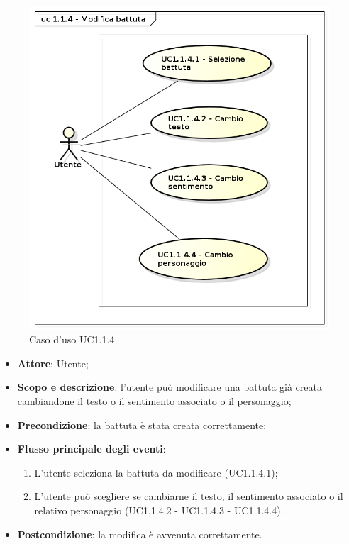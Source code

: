 \begin{figure}[htbp]
\centering
\includegraphics[scale=0.5]{UseCase_17_03_2016/immagini/uc_1_1_4_modifica_battuta.png}
\captionsetup{labelfont=bf}
\caption{Caso d'uso UC1.1.4}
\end{figure}

\begin{itemize}
\item \textbf{Attore}: Utente;
\item \textbf{Scopo e descrizione}: l'utente può modificare una battuta già creata cambiandone il testo o il sentimento associato o il personaggio; 
\item \textbf{Precondizione}: la battuta è stata creata correttamente;
\item \textbf{Flusso principale degli eventi}:
\begin{enumerate}
\item L'utente seleziona la battuta da modificare (UC1.1.4.1);
\item L'utente può scegliere se cambiarne il testo, il sentimento associato o il relativo personaggio (UC1.1.4.2 - UC1.1.4.3 - UC1.1.4.4).
\end{enumerate}
\item \textbf{Postcondizione}: la modifica è avvenuta correttamente.
\end{itemize}

